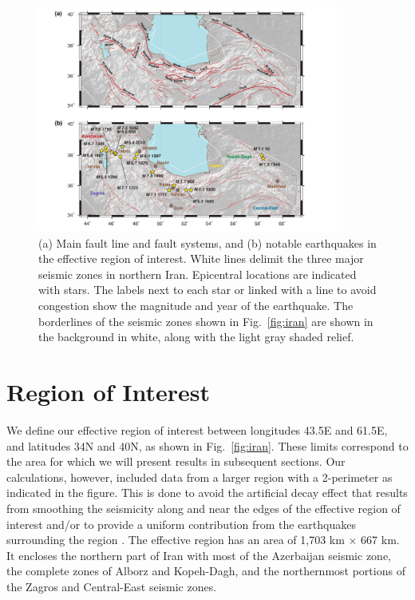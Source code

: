 \begin{figure}[t]
	\centering
	\includegraphics[width=0.9\textwidth]{figures/pdf/figure-02}
	\caption{(a) Main fault line and fault systems, and (b) notable earthquakes in the effective region of interest. White lines delimit the three major seismic zones in northern Iran. Epicentral locations are indicated with stars. The labels next to each star or linked with a line to avoid congestion show the magnitude and year of the earthquake. The borderlines of the seismic zones shown in Fig.~\ref{fig:iran} are shown in the background in white, along with the light gray shaded relief.}
	\label{fig:selected}
\end{figure}

\section{Region of Interest}

We define our effective region of interest between longitudes 43.5\textdegree{}E and 61.5\textdegree{}E, and latitudes 34\textdegree{}N and 40\textdegree{}N, as shown in Fig.~\ref{fig:iran}. These limits correspond to the area for which we will present results in subsequent sections. Our calculations, however, included data from a larger region with a 2\textdegree{}-perimeter as indicated in the figure. This is done to avoid the artificial decay effect that results from smoothing the seismicity along and near the edges of the effective region of interest and/or to provide a uniform contribution from the earthquakes surrounding the region \citep[see][]{Lapajne1997}. The effective region has an area of 1,703 km $\times$ 667 km. It encloses the northern part of Iran with most of the Azerbaijan seismic zone, the complete zones of Alborz and Kopeh-Dagh, and the northernmost portions of the Zagros and Central-East seismic zones.

